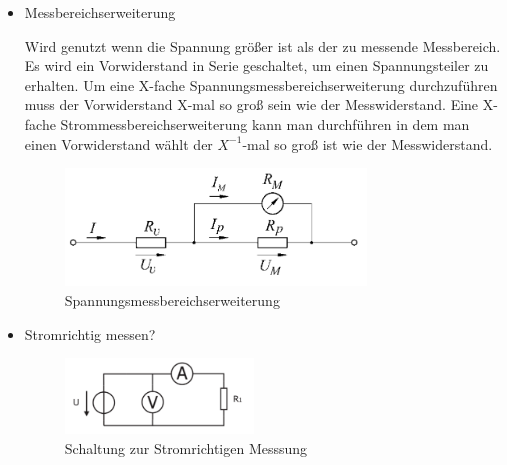 \documentclass{article}
\begin{document}
\begin{itemize}
\item Messbereichserweiterung



 Wird genutzt wenn die Spannung größer ist als der zu messende Messbereich. Es wird ein Vorwiderstand in Serie geschaltet, um einen Spannungsteiler zu erhalten. Um eine X-fache Spannungsmessbereichserweiterung durchzuführen muss der Vorwiderstand X-mal so groß sein wie der Messwiderstand. Eine X-fache Strommessbereichserweiterung kann man durchführen in dem man einen Vorwiderstand wählt der \(X^{-1}\)-mal so groß ist wie der Messwiderstand.  
 
\begin{figure}[h]
\centering
\includegraphics[width=8cm]{pic/messbereichserweiterung2}
\caption{Spannungsmessbereichserweiterung}
\end{figure}



\item Stromrichtig messen? 
\begin{figure}[h]
\centering
\includegraphics[width=5cm]{pic/irichtig}
\caption{ Schaltung zur Stromrichtigen Messsung }
\end{figure}


\end{itemize}
\end{document}
